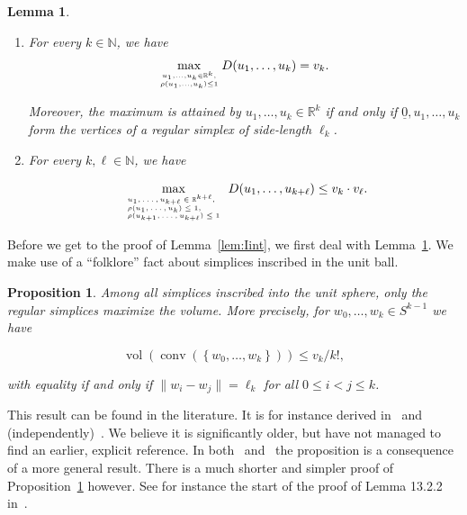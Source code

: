 \documentclass[11pt]{article}%
\newtheorem{lemma} [theorem] {Lemma}%
\newtheorem{proposition} [theorem] {Proposition}%
\newcommand{\eR}[0]{\ensuremath{ \mathbb R}}
\newcommand{\eN}[0]{\ensuremath{ \mathbb N}}
\newcommand{\norm}[1]{\ensuremath{\|#1\|}}
\newcommand{\orig}{\underline{0}}
\DeclareMathOperator{\conv}{conv}
\DeclareMathOperator{\vol}{vol}
\begin{document}
\begin{lemma}\label{lem:det}
$\text{ }$
\begin{enumerate}
\item\label{itm:det} For every $k \in \eN$, we have 
$$
\max_{u_1,\dots,u_k \in \eR^k, \atop \rho(u_1,\dots,u_k)\leq 1} 
D(u_1,\dots,u_k)
= v_k. $$

\noindent
Moreover, the maximum is attained by $u_1,\dots,u_k \in \eR^k$ 
if and only if $\orig,u_1,\dots,u_k$ form the vertices of a regular simplex of side-length $\ell_k$.

\item\label{itm:detgen} For every $k,\ell \in \eN$, we have 

$$
\max_{{\tiny \begin{array}{l} u_1,\dots,u_{k+\ell} \in \eR^{k+\ell},\\\rho(u_1,\dots,u_{k})\leq 1,\\
\rho(u_{k+1},\dots,u_{k+\ell})\leq 1\end{array}}} D(u_1,\dots,u_{k+\ell})
\leq  v_k\cdot v_\ell. $$

\end{enumerate}
\end{lemma}


Before we get to the proof of Lemma~\ref{lem:Iint}, we first deal with Lemma~\ref{lem:det}.
We make use of a ``folklore'' fact about simplices inscribed in the unit ball.

\begin{proposition}\label{prop:slepian}
Among all simplices inscribed into the unit sphere, only the regular simplices maximize the volume. More precisely, for
$w_0,\dots,w_k \in S^{k-1}$ we have 

$$ \vol\left(\conv\left(\left\{w_0,\dots,w_k\right\}\right)\right) \leq v_k/k!, $$

\noindent
with equality if and only if $\norm{w_i-w_j}=\ell_k$ for all $0\leq i<j\leq k$.
\end{proposition}

This result can be found in the literature. 
It is for instance derived in~\cite{Slepian69} and (independently)~\cite{Tanner74}. We believe it is significantly
older, but have not managed to find an earlier, explicit reference. 
In both~\cite{Slepian69} and~\cite{Tanner74} the proposition is a consequence of a more general result. 
There is a much shorter and simpler proof of Proposition~\ref{prop:slepian} however. 
See for instance the start of the proof of Lemma 13.2.2 in~\cite{MatousekDiscrGeom}.
\end{document}
